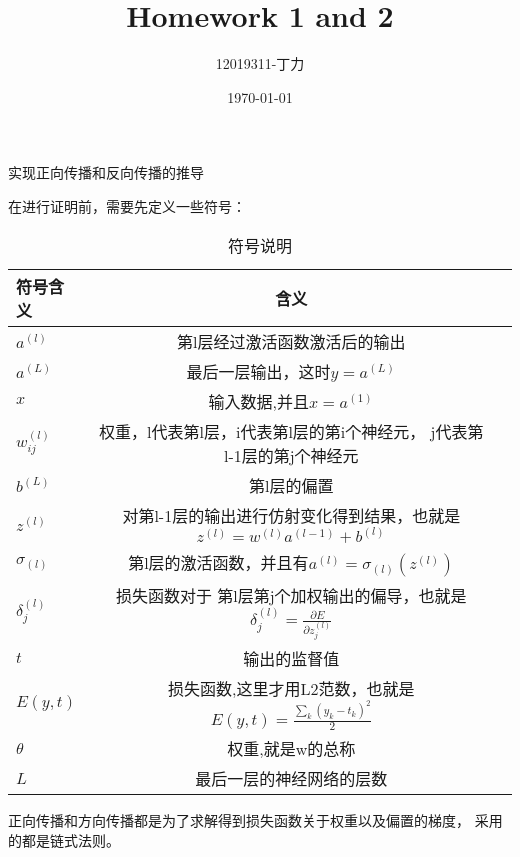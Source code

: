 \documentclass{homework}
\author{12019311-丁力}
\date{\today}
\title{ Homework 1 and 2 }
\begin{document}
 \maketitle

\question 实现正向传播和反向传播的推导


在进行证明前，需要先定义一些符号：
\begin{table}[htbp]
	\centering 
	\caption{\label{tab:test}符号说明}
	\begin{tabular}{lcr}
		\toprule
		符号含义 & 含义  \\
		\midrule
		$a^{(l)}$ & 第l层经过激活函数激活后的输出 \\

		$a^{(L)}$ & 最后一层输出，这时$y=a^{(L)}$ \\
		$x$ & 输入数据,并且$x=a^{(1)}$ \\
		$w_{ij}^{(l)}$ & 权重，l代表第l层，i代表第l层的第i个神经元，
		j代表第l-1层的第j个神经元 \\
		$b^{(L)}$ & 第l层的偏置 \\
		$z^{(l)}$ & 对第l-1层的输出进行仿射变化得到结果，也就是
		$z^{(l)} =w^{(l)}a^{(l-1)} +b^{(l)} $\\
		$\sigma_{(l)}$ & 第l层的激活函数，并且有$a^{(l)} = 
		\sigma_{(l)}(z^{(l)})$\\
		$\delta^{(l)}_j$ & 损失函数对于
		第l层第j个加权输出的偏导，也就是$\delta^{(l)}_j= 
		\frac{\partial E}{\partial z^{(l)}_j}$\\
		$t$ & 输出的监督值 \\
		$E(y,t)$ & 损失函数,这里才用L2范数，也就是$E(y,t) = 
		\frac{\sum_k(y_k-t_k)^2}{2}$ \\
		$\theta$ & 权重,就是w的总称 \\
		$L$ & 最后一层的神经网络的层数 \\
		\bottomrule
	\end{tabular}
\end{table}

正向传播和方向传播都是为了求解得到损失函数关于权重以及偏置的梯度，
采用的都是链式法则。
\iffalse
\noindent Rather than finding the shortest path between two points, suppose our car is low on gas, so we want to take the path that uses the least fuel. In the real world, navigation optimized for fuel consumption may take more steps to reach a destination \footnote{\href{https://blog.google/products/maps/3-new-ways-navigate-more-sustainably-maps/}{Google Maps Blog}}. 

Consider the same MDP, but with two new ``efficient actions'' -- move right or move down. For example, starting from state 3, you can either move to state 4 or 9. Once again, the actions are deterministic and always succeed unless you run into a wall. Attempting to move in the direction of a wall from a gray square using an efficient action results in you moving \textit{down} one square. For clarity, we will use separate symbols $r_s$ for the reward associated with an inefficient action (right $\&$ up, or  right $\&$ down) and $r_e$ for the reward associated with an efficient action.
\fi 
\end{document}

